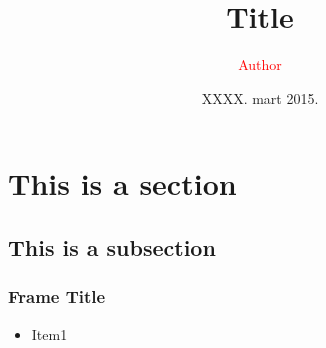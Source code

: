 \documentclass[11pt]{beamer}
\title{Title}
\author[\textcolor{red}{Author}]{\textcolor{red}{Author}}
\date{XXXX. mart 2015.}
\institute{Matematička gimnazija, \textcolor{blue}{\scshape Nedelja informatike}}
\begin{document}
  {
  \begin{frame}
    \titlepage
  \end{frame}
  }

  \section{This is a section}

  \subsection{This is a subsection}

  \begin{frame}
    \frametitle{Frame Title}
    \begin{itemize}
    	\item Item1
    \end{itemize}
  \end{frame}
\end{document}
